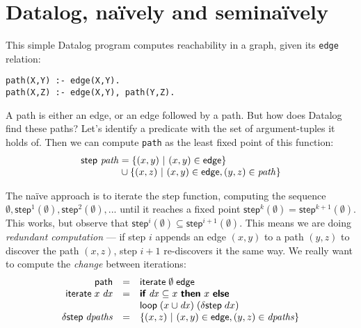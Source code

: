 \documentclass[sigplan,screen,dvipsnames]{acmart}
\newcommand{\todo}[1]{{\color{ACMPurple}#1}}
\newcommand{\naive}{na\"ive}
\newcommand{\setfor}[2]{\{#1 ~|~ #2\}}
\newcommand{\kw}[1]{\textsf{\bfseries #1}}
\newcommand{\tlv}[1]{\textsf{#1}}
\newcommand{\var}[1]{\mathit{#1}}
\newcommand{\dee}[1]{\var{d#1}}
\newcommand{\eif}[2]{\kw{if}~#1~\kw{then}~#2~\kw{else}~}
\begin{document}



\section{Datalog, \naive{}ly and semi\naive{}ly}\label{sec:datalog}

This simple Datalog program computes reachability in a graph, given its
\texttt{edge} relation:
%
\begin{lstlisting}
path(X,Y) :- edge(X,Y).
path(X,Z) :- edge(X,Y), path(Y,Z).
\end{lstlisting}

A path is either an edge, or an edge followed by a path. But how does Datalog
find these paths? Let's identify a predicate with the set of argument-tuples it
holds of. Then we can compute \texttt{path} as the least fixed point of this
function:
%
\[
\begin{array}{l}
  \tlv{step}~ \var{path} = \setfor{(x,y)}{(x,y) \in \tlv{edge}}\\
  \phantom{\tlv{step}~ \var{path}} \hspace{.5pt}\cup
  \setfor{(x,z)}{(x,y) \in \tlv{edge}, (y,z) \in \var{path}}
\end{array}
\]

The \naive{} approach is to iterate the \tlv{step} function, computing the
sequence $\emptyset, \tlv{step}^1(\emptyset), \tlv{step}^2(\emptyset), ...$
until it reaches a fixed point $\tlv{step}^k(\emptyset) =
\tlv{step}^{k+1}(\emptyset)$.
%
This works, but observe that $\tlv{step}^i(\emptyset) \subseteq
\tlv{step}^{i+1}(\emptyset)$. This means we are doing \emph{redundant
  computation} --- if step $i$ appends an edge $(x,y)$ to a path $(y,z)$ to
discover the path $(x,z)$, step $i+1$ re-discovers it the same way. We really
want to compute the \emph{change} between iterations:
%
\[
\begin{array}{rcl}
  \tlv{path} &=& \tlv{iterate} \;\emptyset \;\tlv{edge}\\
  \tlv{iterate} \;x \;\dee x &=&
  \eif{\dee x \subseteq x}{x}\\
  && \tlv{loop} \;(x \cup \dee x) \;(\delta\tlv{step} \;dx)\\
  \delta\tlv{step} \;\var{dpaths} &=&
  \setfor{(x,z)}{(x,y) \in \tlv{edge}, (y,z) \in \var{dpaths}}\\
\end{array}
\]
\end{document}
